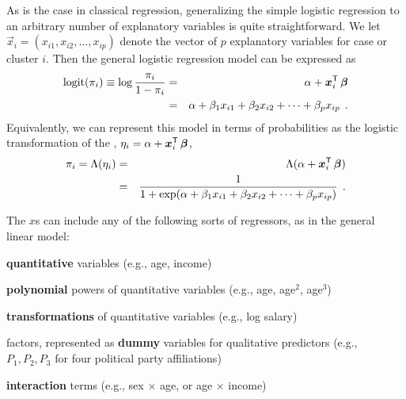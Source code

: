 \documentclass[11pt]{book}\usepackage[]{graphicx}\usepackage[]{color}
\begin{document}
As is the case in classical regression, generalizing the simple logistic
regression to an arbitrary number of explanatory variables is quite straightforward.
We let $\vec{x}_{i} = ( x_{i1}, x_{i2}, \dots , x_{ip})$ denote the vector
of $p$ explanatory variables for case or cluster $i$. Then the general logistic
regression model can be expressed as
\begin{eqnarray}
  \logit ( \pi_{i}) \equiv \log \frac{\pi_i}{1-\pi_i}
   &=& \alpha + \vec{x}_{i}\trans \,  \vec{\beta} \\ \label{eq:logistm1}
   &=& \alpha + \beta_1 x_{i1} + \beta_2 x_{i2} + \cdots + \beta_p x_{ip} \period
   \nonumber
\end{eqnarray}
Equivalently, we can represent this model in terms of probabilities as the
logistic transformation of the , 
$\eta_i =  \alpha + \bm{x}_{i}^\mathsf{T} \,  \bm{\beta} $,
\begin{eqnarray}
   \pi_{i} = \Lambda (\eta_i) 
   &=& \Lambda (\alpha + \bm{x}_{i}^\mathsf{T} \,  \bm{\beta} ) \\ \label{eq:logistm2}
   &=& \frac{1}{1+ \exp(\alpha + \beta_1 x_{i1} + \beta_2 x_{i2} + \cdots + \beta_p x_{ip})} \:\: .
   \nonumber
\end{eqnarray}

The $x$s can include any of the following sorts of regressors,
as in the general linear model:
\begin{itemize*}
\item \textbf{quantitative} variables (e.g., age, income)
\item \textbf{polynomial} powers of quantitative variables (e.g., age, age$^2$, age$^3$)
\item \textbf{transformations} of quantitative variables (e.g., log salary)
\item factors, represented as \textbf{dummy} variables for qualitative predictors (e.g.,
$P_1, P_2, P_3$ for four political party affiliations)
\item \textbf{interaction} terms (e.g., sex $\times$ age, or age $\times$ income)
\end{itemize*}
\end{document}

